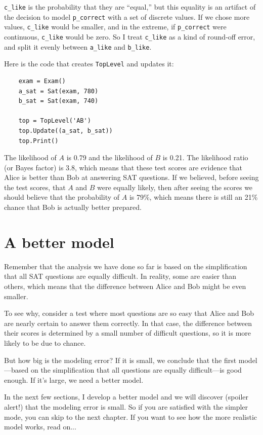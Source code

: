 \documentclass[12pt]{book}
\begin{document}
\verb"c_like" is the probability that they are ``equal,'' but this
equality is an artifact of the decision to model \verb"p_correct" with
a set of discrete values.  If we chose more values, \verb"c_like"
would be smaller, and in the extreme, if \verb"p_correct" were
continuous, \verb"c_like" would be zero.  So I treat \verb"c_like" as
a kind of round-off error, and split it evenly between \verb"a_like"
and \verb"b_like".

Here is the code that creates {\tt TopLevel} and updates it:

\begin{verbatim}
    exam = Exam()
    a_sat = Sat(exam, 780)
    b_sat = Sat(exam, 740)

    top = TopLevel('AB')
    top.Update((a_sat, b_sat))
    top.Print()
\end{verbatim}

The likelihood of $A$ is 0.79 and the likelihood of $B$ is 0.21.  The
likelihood ratio (or Bayes factor) is 3.8, which means that these test
scores are evidence that Alice is better than Bob at answering SAT
questions.  If we believed, before seeing the test scores, that $A$
and $B$ were equally likely, then after seeing the scores we should
believe that the probability of $A$ is 79\%, which means there is
still an 21\% chance that Bob is actually better prepared.


\section{A better model}

Remember that the analysis we have done so far is based on
the simplification that all SAT questions are equally difficult.
In reality, some are easier than others, which means that the
difference between Alice and Bob might be even smaller.

To see why, consider a test where most questions are so easy that
Alice and Bob are nearly certain to answer them correctly.  In that
case, the difference between their scores is determined by a small
number of difficult questions, so it is more likely to be due to
chance.

But how big is the modeling error?  If it is small, we conclude
that the first model---based on the simplification that all questions
are equally difficult---is good enough.  If it's large,
we need a better model.

In the next few sections, I develop a better model and we will
discover (spoiler alert!) that the modeling error is small.  So if
you are satisfied with the simpler mode, you can skip to the next
chapter.  If you want to see how the more realistic model works,
read on...
\end{document}
